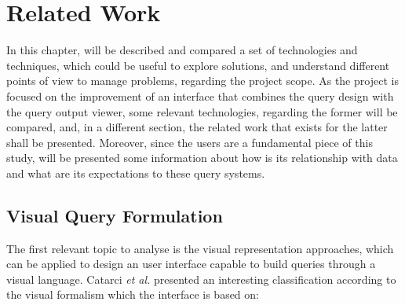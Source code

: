 \chapter{Related Work}
\label{cha:related_work}
In this chapter, will be described and compared a set of technologies and techniques, which could be useful to explore solutions, and understand different points of view to manage problems, regarding the project scope. As the project is focused on the improvement of an interface that combines the query design with the query output viewer, some relevant technologies, regarding the former will be compared, and, in a different section, the related work that exists for the latter shall be presented. Moreover, since the users are a fundamental piece of this study, will be presented some information about how is its relationship with data and what are its expectations to these query systems.

\section{Visual Query Formulation}
\label{sec:visual_query_formulation}

The first relevant topic to analyse is the visual representation approaches, which can be applied to design an user interface capable to build queries through a visual language. Catarci \textit{et al.} \cite{visualQuerySystemsForDatabases_aSurvey} presented an interesting classification according to the visual formalism which the interface is based on:

